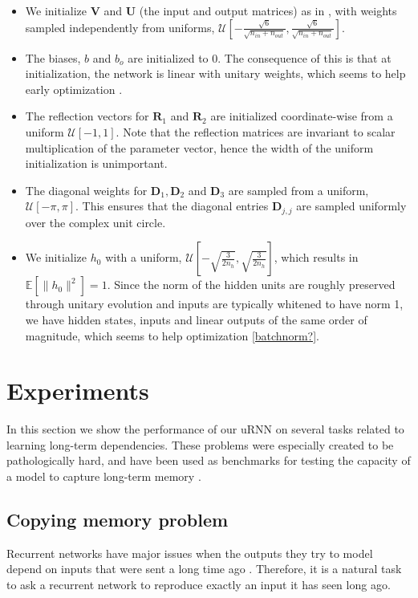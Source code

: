 \documentclass{article} %
\newcommand{\matr}[1]{\mathbf{#1}}
\begin{document}
\begin{itemize}
  \item We initialize $\matr{V}$ and $\matr{U}$ (the input and output matrices) as in \cite{Glorotinit},
  with weights sampled independently from uniforms, $\mathcal{U}\left[-\frac{\sqrt{6}}{\sqrt{n_{in}+ n_{out}}}, \frac{\sqrt{6}}{\sqrt{n_{in}+ n_{out}}}\right]$.
  \item The biases, $b$ and $b_o$ are initialized to 0. The consequence of this is that at initialization, 
    the network is linear with unitary weights, which seems to help early optimization \citep{Saxe2014}.
  \item The reflection vectors for $\matr{R}_1$ and $\matr{R}_2$ are initialized coordinate-wise from a 
  uniform $\mathcal{U}[-1, 1]$. Note that the reflection matrices are invariant to scalar multiplication 
  of the parameter vector, hence the width of the uniform initialization is unimportant.
  \item The diagonal weights for $\matr{D}_1, \matr{D}_2$ and $\matr{D}_3$ are sampled 
  from a uniform, $\mathcal{U}[-\pi, \pi]$. This ensures that the diagonal entries $\matr{D}_{j,j}$
  are sampled uniformly over the complex unit circle.
  \item We initialize $h_0$ with a uniform, 
  $\mathcal{U}\left[-\sqrt{\frac{3}{2n_h}}, \sqrt{\frac{3}{2n_h}} \right]$, 
  which results in $\mathbb{E}\left[\|h_0\|^2\right] = 1$. Since the norm of the hidden units are roughly 
  preserved through unitary evolution and inputs are typically whitened to have norm 1, 
  we have hidden states, inputs and linear outputs of the same order of magnitude, which seems to
  help optimization \ref{batchnorm?}.
\end{itemize}


\section{Experiments}
In this section we show the performance of our uRNN on several tasks related to learning long-term dependencies. These problems were especially created to be pathologically hard, and have been used as benchmarks for testing the capacity of a model to capture long-term memory \citep{LSTM} \citep{HF} \citep{Quoc2015}.

\subsection{Copying memory problem}
Recurrent networks have major issues when the outputs they try to model depend on inputs that were sent a long time ago \citep{Yoshua94} \citep{Pascanu2013}. Therefore, it is a natural task to ask a recurrent network to reproduce exactly an input it has seen long ago.
\end{document}
